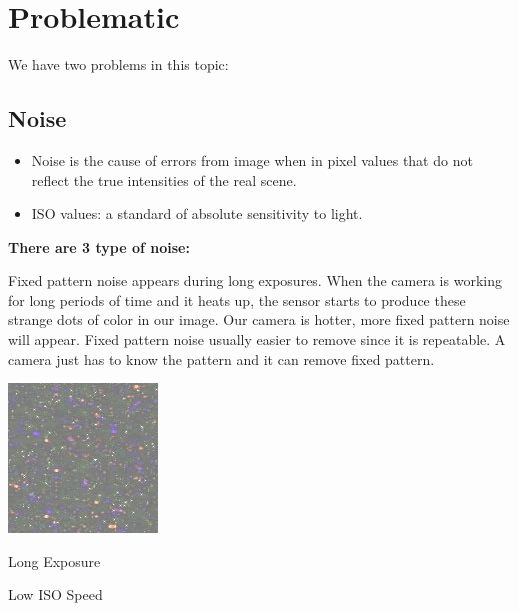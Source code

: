 \vspace*{1cm}



\section{Problematic}
We have two problems in this topic:





\subsection*{Noise}
\begin{itemize}
\item Noise is the cause of errors from image when in pixel values
that do not reflect the true intensities of the real scene.

\item ISO values: a standard of absolute sensitivity to light.
\end{itemize}
\vspace{0.3cm}

\textbf{There are 3 type of noise:}
\vspace{0.3cm}

Fixed pattern noise appears during long exposures. When the camera is working for long periods of time and it heats up, the sensor starts to produce these strange dots of color in our image. Our camera is hotter, more fixed pattern noise will appear. Fixed pattern noise usually easier to remove since it is repeatable. A camera just has to know the pattern and it can remove fixed pattern.
\vspace{0.5cm}

\begin{center}
	\includegraphics{fix.png}

Long Exposure

Low ISO Speed
\end{center}
\vspace{0.5cm}


